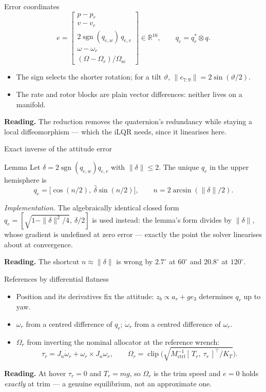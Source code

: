 \documentclass[10pt]{beamer}
\newcommand{\takeaway}[1]{\par\vfill{\footnotesize\textbf{Reading.} #1\par}}
\begin{document}
\begin{frame}{Error coordinates}
  \[
    e=\begin{bmatrix}
      p-p_r\\ v-v_r\\ 2\operatorname{sgn}(q_{e,w})\,q_{e,v}\\
      \omega-\omega_r\\ (\Omega-\Omega_r)/\Omega_{\mathrm{sc}}
    \end{bmatrix}\in\mathbb{R}^{16},
    \qquad q_e=q_r^{*}\otimes q .
  \]
  \begin{itemize}
    \item The sign selects the shorter rotation; for a tilt $\vartheta$,
      $\|e_{7:9}\|=2\sin(\vartheta/2)$.
    \item The rate and rotor blocks are plain vector differences: neither
      lives on a manifold.
  \end{itemize}
  \takeaway{The reduction removes the quaternion's redundancy while staying a
    local diffeomorphism --- which the iLQR needs, since it linearises here.}
\end{frame}

\begin{frame}{Exact inverse of the attitude error}
  \begin{block}{Lemma}
    Let $\delta=2\operatorname{sgn}(q_{e,w})q_{e,v}$ with $\|\delta\|\le2$.
    The unique $q_e$ in the upper hemisphere is
    \[
      q_e=\big[\cos(n/2),\ \hat\delta\sin(n/2)\big],
      \qquad n=2\arcsin(\|\delta\|/2).
    \]
  \end{block}
  \emph{Implementation.} The algebraically identical closed form
  $q_e=[\sqrt{1-\|\delta\|^{2}/4},\ \delta/2]$ is used instead: the lemma's
  form divides by $\|\delta\|$, whose gradient is undefined at zero error ---
  exactly the point the solver linearises about at convergence.
  \takeaway{The shortcut $n\approx\|\delta\|$ is wrong by $2.7^\circ$ at
    $60^\circ$ and $20.8^\circ$ at $120^\circ$.}
\end{frame}

\begin{frame}{References by differential flatness}
  \begin{itemize}
    \item Position and its derivatives fix the attitude: $z_b\propto a_r+ge_3$
      determines $q_r$ up to yaw.
    \item $\omega_r$ from a centred difference of $q_r$;
      $\dot\omega_r$ from a centred difference of $\omega_r$.
    \item $\Omega_r$ from inverting the nominal allocator at the reference
      wrench:
      \[
        \tau_r=J_n\dot\omega_r+\omega_r\times J_n\omega_r,
        \qquad
        \Omega_r=\operatorname{clip}\Big(\sqrt{M_{\mathrm{ctrl}}^{-1}
          [\,T_r,\ \tau_r\,]^{\!\top}/K_T}\Big).
      \]
  \end{itemize}
  \takeaway{At hover $\tau_r=0$ and $T_r=mg$, so $\Omega_r$ is the trim speed
    and $e=0$ holds \emph{exactly} at trim --- a genuine equilibrium, not an
    approximate one.}
\end{frame}
\end{document}
